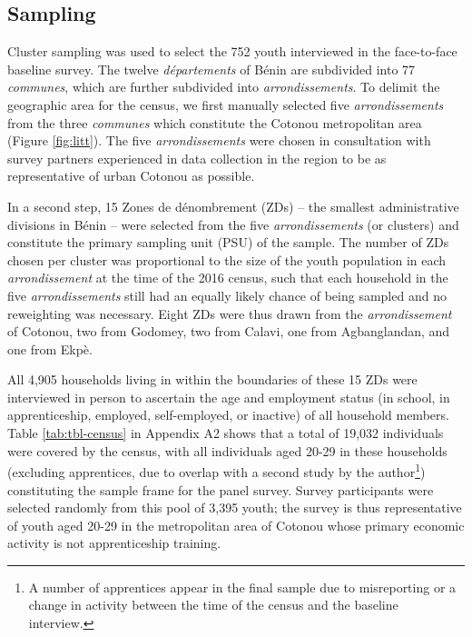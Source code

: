 \documentclass[
  a4paper, twoside, 12pt]{book}
\begin{document}
\begin{singlespacing}

\end{singlespacing}

\newpage

\hypertarget{sampling}{%
\subsection*{Sampling}\label{sampling}}


Cluster sampling was used to select the 752 youth interviewed in the face-to-face baseline survey. The twelve \emph{départements} of Bénin are subdivided into 77 \emph{communes}, which are further subdivided into \emph{arrondissements}. To delimit the geographic area for the census, we first manually selected five \emph{arrondissements} from the three \emph{communes} which constitute the Cotonou metropolitan area (Figure \ref{fig:litt}). The five \emph{arrondissements} were chosen in consultation with survey partners experienced in data collection in the region to be as representative of urban Cotonou as possible.

In a second step, 15 Zones de dénombrement (ZDs) -- the smallest administrative divisions in Bénin -- were selected from the five \emph{arrondissements} (or clusters) and constitute the primary sampling unit (PSU) of the sample. The number of ZDs chosen per cluster was proportional to the size of the youth population in each \emph{arrondissement} at the time of the 2016 census, such that each household in the five \emph{arrondissements} still had an equally likely chance of being sampled and no reweighting was necessary. Eight ZDs were thus drawn from the \emph{arrondissement} of Cotonou, two from Godomey, two from Calavi, one from Agbanglandan, and one from Ekpè.

All 4,905 households living in within the boundaries of these 15 ZDs were interviewed in person to ascertain the age and employment status (in school, in apprenticeship, employed, self-employed, or inactive) of all household members. Table \ref{tab:tbl-census} in Appendix A2 shows that a total of 19,032 individuals were covered by the census, with all individuals aged 20-29 in these households (excluding apprentices, due to overlap with a second study by the author\footnote{A number of apprentices appear in the final sample due to misreporting or a change in activity between the time of the census and the baseline interview.}) constituting the sample frame for the panel survey. Survey participants were selected randomly from this pool of 3,395 youth; the survey is thus representative of youth aged 20-29 in the metropolitan area of Cotonou whose primary economic activity is not apprenticeship training.
\end{document}
